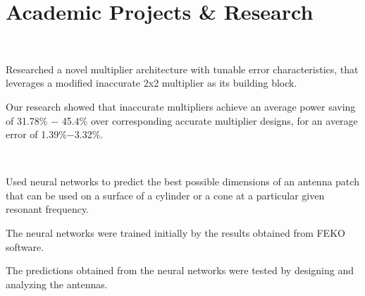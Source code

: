 \documentclass[letterpaper]{deedy-resume} %
\begin{document}
\hfill
\begin{minipage}[t]{0.66\textwidth} %


\section{Academic Projects \& Research}

 \\

\vspace{\topsep} %
\begin{tightitemize}
\item Researched a novel multiplier architecture with tunable error characteristics, that leverages a modified inaccurate 2x2 multiplier as its building block.
\item Our research showed that inaccurate multipliers achieve an average power saving of 31.78\% − 45.4\% over corresponding accurate multiplier designs, for an average error of 1.39\%−3.32\%.
\end{tightitemize}

\sectionspace %


 \\
\begin{tightitemize}
\item Used neural networks to predict the best possible dimensions of an antenna patch that can be used on a surface of a cylinder or a cone at a particular given resonant frequency. 
\item The neural networks were trained initially by the results obtained from FEKO software.
\item The predictions obtained from the neural networks were tested by designing and analyzing the antennas.
\end{tightitemize}

\sectionspace %



\end{minipage}
\end{document}
